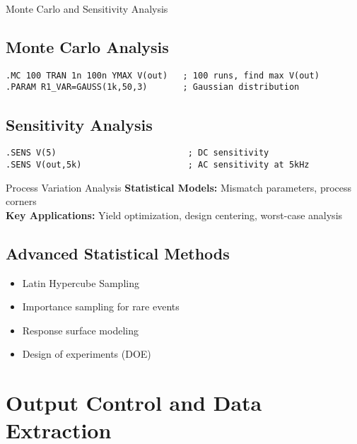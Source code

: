 \documentclass{beamer}
\begin{document}
\begin{frame}{Monte Carlo and Sensitivity Analysis}
    \subsection{Monte Carlo Analysis}
    \begin{lstlisting}
.MC 100 TRAN 1n 100n YMAX V(out)   ; 100 runs, find max V(out)
.PARAM R1_VAR=GAUSS(1k,50,3)       ; Gaussian distribution
    \end{lstlisting}
    
    \subsection{Sensitivity Analysis}
    \begin{lstlisting}
.SENS V(5)                          ; DC sensitivity
.SENS V(out,5k)                     ; AC sensitivity at 5kHz
    \end{lstlisting}
    
    \begin{alertblock}{Process Variation Analysis}
        \textbf{Statistical Models:} Mismatch parameters, process corners \\
        \textbf{Key Applications:} Yield optimization, design centering, worst-case analysis
    \end{alertblock}
    
    \subsection{Advanced Statistical Methods}
    \begin{itemize}
        \item Latin Hypercube Sampling
        \item Importance sampling for rare events
        \item Response surface modeling
        \item Design of experiments (DOE)
    \end{itemize}
\end{frame}

\section{Output Control and Data Extraction}
\end{document}
